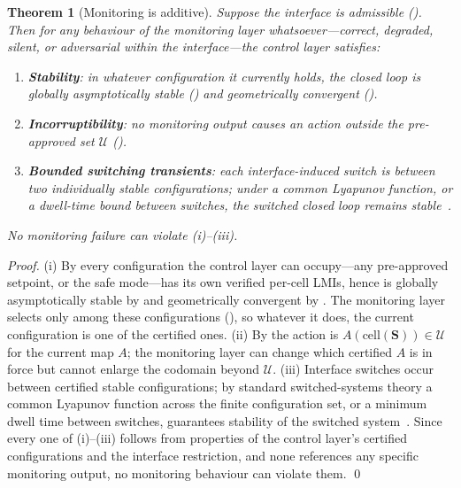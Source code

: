\documentclass[11pt,a4paper,twocolumn]{article}
\theoremstyle{thmstyle}
\newtheorem{theorem}{Theorem}[section]
\theoremstyle{definition}
\theoremstyle{remark}
\newcommand{\Us}{\mathcal{U}}
\newcommand{\Ss}{\mathbf{S}}
\begin{document}
\begin{theorem}[Monitoring is additive]
\label{thm:additive}
Suppose the interface is admissible \textup{(}\textup{)}.
Then for any behaviour of the monitoring layer whatsoever---correct,
degraded, silent, or adversarial within the interface---the control layer
satisfies:
\begin{enumerate}[label=\textup{(\roman*)},leftmargin=2.2em,itemsep=1pt]
\item \textbf{Stability}: in whatever configuration it currently holds,
the closed loop is globally asymptotically stable
() and geometrically convergent
().
\item \textbf{Incorruptibility}: no monitoring output causes an action
outside the pre-approved set $\Us$ ().
\item \textbf{Bounded switching transients}: each interface-induced
switch is between two individually stable configurations; under a
common Lyapunov function, or a dwell-time bound between switches, the
switched closed loop remains stable~\citep{liberzon2003switching}.
\end{enumerate}
No monitoring failure can violate \textup{(i)}--\textup{(iii)}.
\end{theorem}

\begin{proof}
(i) By  every configuration the control layer
can occupy---any pre-approved setpoint, or the safe mode---has its own
verified per-cell LMIs, hence is globally asymptotically stable by
 and geometrically convergent by . The
monitoring layer selects only among these configurations
(), so whatever it does, the current configuration is
one of the certified ones. (ii) By  the action is
$A(\mathrm{cell}(\Ss))\in\Us$ for the current map $A$; the monitoring
layer can change which certified $A$ is in force but cannot enlarge the
codomain beyond $\Us$. (iii) Interface switches occur between certified
stable configurations; by standard switched-systems theory a common
Lyapunov function across the finite configuration set, or a minimum dwell
time between switches, guarantees stability of the switched
system~\citep{liberzon2003switching}. Since every one of (i)--(iii)
follows from properties of the control layer's certified configurations
and the interface restriction, and none references any specific
monitoring output, no monitoring behaviour can violate them. \qed
\end{proof}
\end{document}
